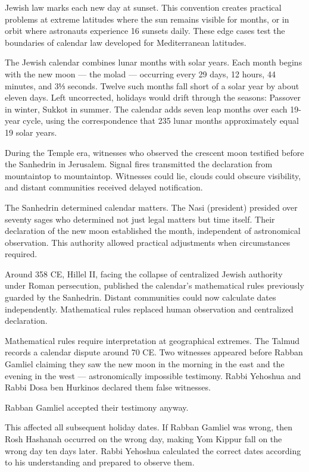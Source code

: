 Jewish law marks each new day at sunset. This convention creates practical problems at extreme latitudes where the sun remains visible for months, or in orbit where astronauts experience 16 sunsets daily. These edge cases test the boundaries of calendar law developed for Mediterranean latitudes.

The Jewish calendar combines lunar months with solar years. Each month begins with the new moon — the molad — occurring every 29 days, 12 hours, 44 minutes, and 3⅓ seconds. Twelve such months fall short of a solar year by about eleven days. Left uncorrected, holidays would drift through the seasons: Passover in winter, Sukkot in summer. The calendar adds seven leap months over each 19-year cycle, using the correspondence that 235 lunar months approximately equal 19 solar years.

During the Temple era, witnesses who observed the crescent moon testified before the Sanhedrin in Jerusalem. Signal fires transmitted the declaration from mountaintop to mountaintop. Witnesses could lie, clouds could obscure visibility, and distant communities received delayed notification.

The Sanhedrin determined calendar matters. The Nasi (president) presided over seventy sages who determined not just legal matters but time itself. Their declaration of the new moon established the month, independent of astronomical observation. This authority allowed practical adjustments when circumstances required.

Around 358 CE, Hillel II, facing the collapse of centralized Jewish authority under Roman persecution, published the calendar's mathematical rules previously guarded by the Sanhedrin. Distant communities could now calculate dates independently. Mathematical rules replaced human observation and centralized declaration.

Mathematical rules require interpretation at geographical extremes. The Talmud records a calendar dispute around 70 CE. Two witnesses appeared before Rabban Gamliel claiming they saw the new moon in the morning in the east and the evening in the west — astronomically impossible testimony. Rabbi Yehoshua and Rabbi Dosa ben Hurkinos declared them false witnesses.

Rabban Gamliel accepted their testimony anyway.

This affected all subsequent holiday dates. If Rabban Gamliel was wrong, then Rosh Hashanah occurred on the wrong day, making Yom Kippur fall on the wrong day ten days later. Rabbi Yehoshua calculated the correct dates according to his understanding and prepared to observe them.

